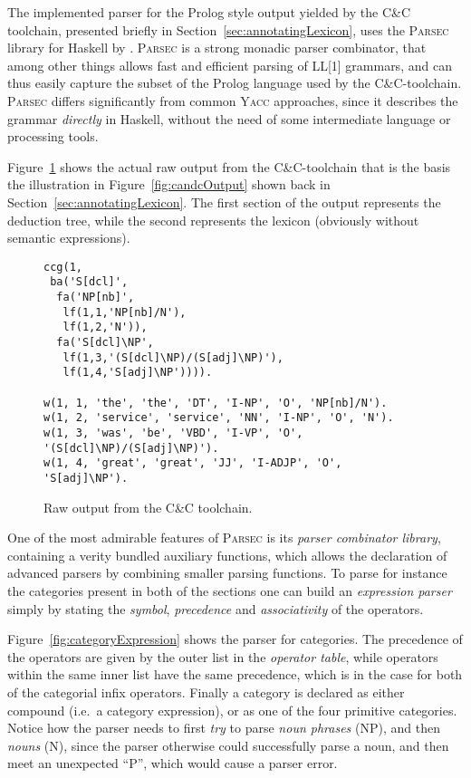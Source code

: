 The implemented parser for the Prolog style output yielded by the C\&C toolchain, presented briefly in Section~\ref{sec:annotatingLexicon}, uses the \textsc{Parsec} library for Haskell by \citeauthor{parsec} . \textsc{Parsec} is a strong monadic parser combinator, that among other things allows fast and efficient parsing of LL[1] grammars, and can thus easily capture the subset of the Prolog language used by the C\&C-toolchain. \textsc{Parsec} differs significantly from common \textsc{Yacc} approaches, since it describes the grammar \emph{directly} in Haskell, without the need of some intermediate language or processing tools.

Figure~\ref{fig:candcOutputReal} shows the actual raw output from the C\&C-toolchain that is the basis the illustration in Figure~\ref{fig:candcOutput} shown back in Section~\ref{sec:annotatingLexicon}. The first section of the output represents the deduction tree, while the second represents the lexicon (obviously without semantic expressions).

\begin{figure}[ht]
\center
\begin{cframed}{.8\textwidth}
	\scriptsize
	\begin{verbatim}
ccg(1,
 ba('S[dcl]',
  fa('NP[nb]',
   lf(1,1,'NP[nb]/N'),
   lf(1,2,'N')),
  fa('S[dcl]\NP',
   lf(1,3,'(S[dcl]\NP)/(S[adj]\NP)'),
   lf(1,4,'S[adj]\NP')))).

w(1, 1, 'the', 'the', 'DT', 'I-NP', 'O', 'NP[nb]/N').
w(1, 2, 'service', 'service', 'NN', 'I-NP', 'O', 'N').
w(1, 3, 'was', 'be', 'VBD', 'I-VP', 'O', '(S[dcl]\NP)/(S[adj]\NP)').
w(1, 4, 'great', 'great', 'JJ', 'I-ADJP', 'O', 'S[adj]\NP').
	\end{verbatim}
\end{cframed}
\vspace{1em}
	\caption{Raw output from the C\&C toolchain.}
	\label{fig:candcOutputReal}
\end{figure}

One of the most admirable features of \textsc{Parsec} is its \emph{parser combinator library}, containing a verity bundled auxiliary functions, which allows the declaration of advanced parsers by combining smaller parsing functions. To parse for instance the categories present in both of the sections one can build an \emph{expression parser} simply by stating the \emph{symbol}, \emph{precedence} and \emph{associativity} of the operators.

Figure~\ref{fig:categoryExpression} shows the parser for categories. The precedence of the operators are given by the outer list in the \emph{operator table}, while operators within the same inner list have the same precedence, which is in the case for both of the categorial infix operators. Finally a category is declared as either compound (i.e.\ a category expression), or as one of the four primitive categories. Notice how the parser needs to first \emph{try} to parse \emph{noun phrases} (NP), and then \emph{nouns} (N), since the parser otherwise could successfully parse a noun, and then meet an unexpected ``P'', which would cause a parser error.


